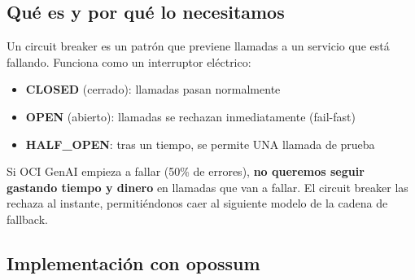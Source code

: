 \documentclass[11pt,a4paper]{article}
\begin{document}
\subsection{Qu\'e es y por qu\'e lo necesitamos}

Un circuit breaker es un patr\'on que previene llamadas a un servicio que est\'a fallando. Funciona como un interruptor el\'ectrico:

\begin{itemize}[leftmargin=*]
    \item \textbf{CLOSED} (cerrado): llamadas pasan normalmente
    \item \textbf{OPEN} (abierto): llamadas se rechazan inmediatamente (fail-fast)
    \item \textbf{HALF\_OPEN}: tras un tiempo, se permite UNA llamada de prueba
\end{itemize}

Si OCI GenAI empieza a fallar (50\% de errores), \textbf{no queremos seguir gastando tiempo y dinero} en llamadas que van a fallar. El circuit breaker las rechaza al instante, permiti\'endonos caer al siguiente modelo de la cadena de fallback.

\subsection{Implementaci\'on con opossum}
\end{document}

